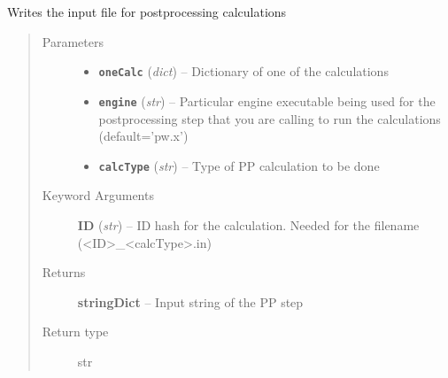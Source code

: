 \documentclass[letterpaper,10pt,english]{sphinxmanual}
\begin{document}
\begin{fulllineitems}
\label{run:run.__makeInput}
Writes the input file for postprocessing calculations
\begin{quote}\begin{description}
\item[{Parameters}] \leavevmode\begin{itemize}
\item {} 
\textbf{\texttt{oneCalc}} (\emph{dict}) -- Dictionary of one of the calculations

\item {} 
\textbf{\texttt{engine}} (\emph{str}) -- Particular engine executable being used for the postprocessing step
that you are calling to run the calculations (default='pw.x')

\item {} 
\textbf{\texttt{calcType}} (\emph{str}) -- Type of PP calculation to be done

\end{itemize}

\item[{Keyword Arguments}] \leavevmode
\textbf{ID} (\emph{str}) --
ID hash for the calculation. Needed for the filename (\textless{}ID\textgreater{}\_\textless{}calcType\textgreater{}.in)

\item[{Returns}] \leavevmode
\textbf{stringDict} --
Input string of the PP step

\item[{Return type}] \leavevmode
str

\end{description}\end{quote}

\end{fulllineitems}

\end{document}
